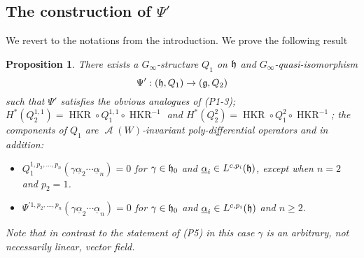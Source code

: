 \documentclass{amsart}
\numberwithin{equation}{section}
\let\cal\mathcal
\newtheorem{propositions}[lemmas]{Proposition}
\theoremstyle{definition}
\theoremstyle{remark}
\begin{document}
\subsection{The construction of $\Psi'$}
We revert to the notations from the introduction. 
We prove the following result
\begin{propositions} \label{ref-A.3.1-53} There exists a $G_\infty$-structure $Q_1$ on
  $\frak{h}$ and  $G_\infty$-quasi-isomorphism
\[
\Psi':(\frak{h},Q_1)\rightarrow (\frak{g},Q_2)
\]
such that $\Psi'$ satisfies the obvious analogues of (P1-3);
$H^\ast(Q_2^{1,1})={\operatorname{HKR}}\circ Q^{1,1}_1\circ {\operatorname{HKR}}^{-1}$ and
$H^\ast(Q^2_2)={\operatorname{HKR}}\circ Q^2_1\circ {\operatorname{HKR}}^{-1}$; the components of $Q_1$ are
${\operatorname{{\cal A}}}(W)$-invariant poly-differential operators and in addition:
\begin{itemize}
\item[(R1)]
  $Q_1^{1,p_2,\ldots,p_n}(\gamma\underline{\alpha}_2\cdots\underline{\alpha}_n)=0$
  for $\gamma\in \frak{h}_0$
  and $\underline{\alpha}_i\in L^{c,p_i}(\frak{h})$, except when $n=2$ and
$p_2=1$.
\item[(R2)] $\Psi^{\prime 1,p_2,\ldots,p_n}(\gamma\underline{\alpha}_2\cdots\underline{\alpha}_n)=0$ for
  $\gamma\in \frak{h}_0$
  and $\underline{\alpha}_i\in L^{c,p_i}(\frak{h})$  and $n\geq2$.
\end{itemize}
Note that in contrast to the statement of (P5) in this case $\gamma$ is an arbitrary, not necessarily linear,
vector field.
\end{propositions}
\end{document}
